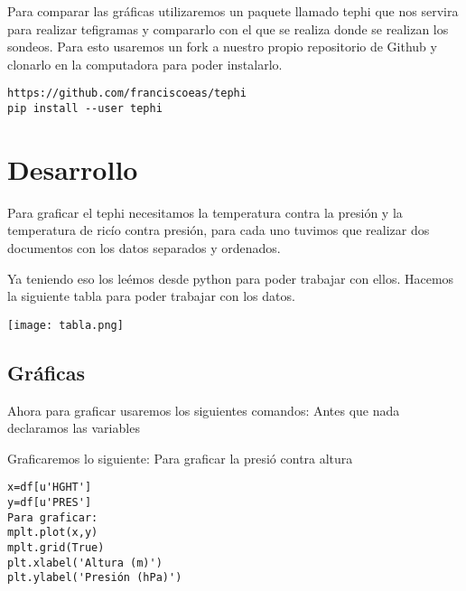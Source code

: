 \documentclass[12pt]{article}
\begin{document}
Para comparar las gráficas utilizaremos un paquete llamado tephi que nos servira para realizar tefigramas y compararlo con el que se realiza donde se realizan los sondeos.
Para esto usaremos un fork a nuestro propio repositorio de Github y clonarlo en la computadora para poder instalarlo.

\begin{verbatim}
https://github.com/franciscoeas/tephi
pip install --user tephi
\end{verbatim}


\section{Desarrollo}
Para graficar el tephi necesitamos la temperatura contra la presión y la temperatura de ricío contra presión, para cada uno tuvimos que realizar dos documentos con los datos separados y ordenados. 

Ya teniendo eso los leémos desde python para poder trabajar con ellos. Hacemos la siguiente tabla para poder trabajar con los datos.
\begin{center}
\texttt{[image: tabla.png]}
\end{center}

\newpage
\subsection{Gráficas}
Ahora para graficar usaremos los siguientes comandos:
Antes que nada declaramos las variables

Graficaremos lo siguiente: 
Para graficar la presió contra altura
\begin{verbatim}
x=df[u'HGHT']
y=df[u'PRES']
Para graficar:
mplt.plot(x,y)
mplt.grid(True)
plt.xlabel('Altura (m)')
plt.ylabel('Presión (hPa)')
\end{verbatim}
\end{document}
